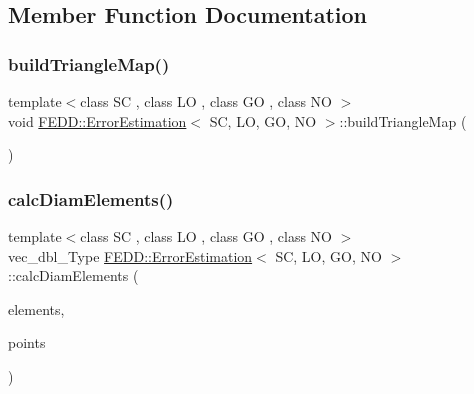 \subsection{Member Function Documentation}
\mbox{\label{classFEDD_1_1ErrorEstimation_a7bf02e0d688631bb71d3263841dd59e0}} 
\subsubsection{\texorpdfstring{build\+Triangle\+Map()}{buildTriangleMap()}}
{\footnotesize\ttfamily template$<$class SC , class LO , class GO , class NO $>$ \\
void \hyperlink{classFEDD_1_1ErrorEstimation}{F\+E\+D\+D\+::\+Error\+Estimation}$<$ SC, LO, GO, NO $>$\+::build\+Triangle\+Map (\begin{DoxyParamCaption}{ }\end{DoxyParamCaption})}

\mbox{\label{classFEDD_1_1ErrorEstimation_ae2ffbe18cdcbc6b9974dd687e3cec91d}} 
\subsubsection{\texorpdfstring{calc\+Diam\+Elements()}{calcDiamElements()}}
{\footnotesize\ttfamily template$<$class SC , class LO , class GO , class NO $>$ \\
vec\+\_\+dbl\+\_\+\+Type \hyperlink{classFEDD_1_1ErrorEstimation}{F\+E\+D\+D\+::\+Error\+Estimation}$<$ SC, LO, GO, NO $>$\+::calc\+Diam\+Elements (\begin{DoxyParamCaption}\item[{\hyperlink{classFEDD_1_1ErrorEstimation_ae8e03ce6215a8a139c1c8e9d662030ce}{Elements\+Ptr\+\_\+\+Type}}]{elements,  }\item[{vec2\+D\+\_\+dbl\+\_\+ptr\+\_\+\+Type}]{points }\end{DoxyParamCaption})}



